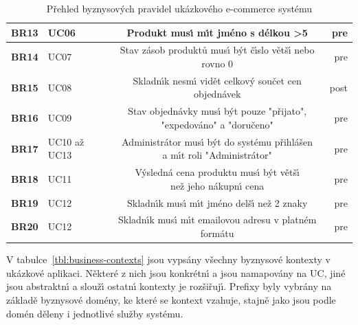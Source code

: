 \begin{table}
\begin{tabular}{ l l c r }
        \textbf{BR13} & UC06 & Produkt mus\'{\i} m\'{\i}t jméno s délkou >5 & pre \\ \hline
        \textbf{BR14} & UC07 & Stav zásob produktů mus\'{\i} b\'yt č\'{\i}slo větš\'{\i} nebo rovno 0 & pre \\ \hline
        \textbf{BR15} & UC08 & Skladn\'{\i}k nesm\'{\i} vidět celkov\'y součet cen objednávek & post \\ \hline
        \textbf{BR16} & UC09 & \makecell[c]{Stav objednávky mus\'{\i} b\'yt pouze "přijato", \\ "expedováno" a "doručeno"} & pre \\ \hline
        \textbf{BR17} & UC10 až UC13 & \makecell[c]{Administrátor mus\'{\i} b\'yt do systému přihlášen \\ a m\'{\i}t roli "Administrátor"} & pre \\ \hline
        \textbf{BR18} & UC11 & \makecell[c]{V\'ysledná cena produktu mus\'{\i} b\'yt větš\'{\i} \\ než jeho nákupn\'{\i} cena} & pre \\ \hline
        \textbf{BR19} & UC12 & Skladn\'{\i}k mus\'{\i} m\'{\i}t jméno delš\'{\i} než 2 znaky & pre \\ \hline
        \textbf{BR20} & UC12 & Skladn\'{\i}k mus\'{\i} m\'{\i}t emailovou adresu v platném formátu & pre \\
        \hline
    \end{tabular}
    \caption{Přehled byznysov\'ych pravidel ukázkového e-commerce systému}
    \label{tbl:business-rules}
\end{table}

V tabulce~\ref{tbl:business-contexts} jsou vypsány všechny byznysové kontexty v ukázkové aplikaci.
Některé z nich jsou konkrétn\'{\i} a jsou namapovány na \gls{UC}, jiné jsou abstraktn\'{\i} a slouž\'{\i}
ostatn\'{\i} kontexty je rozšiřuj\'{\i}. Prefixy byly vybrány na základě byznysové domény, ke které se
kontext vzahuje, stajně jako jsou podle domén děleny i jednotlivé služby systému.

